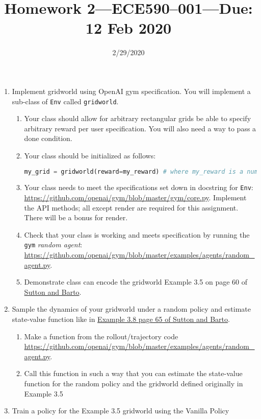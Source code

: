 \documentclass{article}
\title{Homework 2---ECE590--001---{\bf Due: 12 Feb 2020}}
\date{2/29/2020}
\begin{document}
\maketitle
\begin{enumerate}
\item Implement gridworld using OpenAI gym specification. You will implement a
sub-class of {\tt Env} called {\tt gridworld}.
  \begin{enumerate}
  \item Your class should allow for arbitrary rectangular grids be able to
    specify arbitrary reward per user specification. You will also need a way to
    pass a done condition.
  \item Your class should be initialized as follows:
    \begin{lstlisting}[language=python]
      my_grid = gridworld(reward=my_reward) # where my_reward is a numpy.array of shape (n,m)
    \end{lstlisting}
  \item Your class needs to meet the specifications set down in docstring for
    {\tt Env}: \url{https://github.com/openai/gym/blob/master/gym/core.py}.
    Implement the API methods; all except render are required for this assignment.
    There will be a bonus for render.
  \item Check that your class is working and meets specification by running the
    {\tt gym} {\em random agent}:
    \url{https://github.com/openai/gym/blob/master/examples/agents/random_agent.py}.
  \item Demonstrate class can encode the gridworld Example 3.5 on page 60 of
    \href{http://incompleteideas.net/book/RLbook2018.pdf}{Sutton and Barto}.
  \end{enumerate}
\item
  Sample the dynamics of your gridworld under a random policy and estimate
  state-value function like in
  \href{http://www.incompleteideas.net/book/RLbook2018.pdf}{Example 3.8 page 65 of Sutton and Barto}.
  \begin{enumerate}
  \item Make a function from the rollout/trajectory code
    \url{https://github.com/openai/gym/blob/master/examples/agents/random_agent.py}.
  \item Call this function in such a way that you can estimate the state-value
    function for the random policy and the gridworld defined originally in Example
    3.5
  \end{enumerate}
\item Train a policy for the Example 3.5 gridworld using the Vanilla Policy

\end{enumerate}
\end{document}
